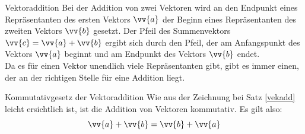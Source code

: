 \begin{satz}{Vektoraddition}{}\label{vekadd}
Bei der Addition von zwei Vektoren wird an den Endpunkt eines Repräsentanten des ersten Vektors $\vv{a}$ der Beginn eines Repräsentanten des zweiten Vektors $\vv{b}$ gesetzt. Der Pfeil des Summenvektors $\vv{c} = \vv{a} + \vv{b}$ ergibt sich durch den Pfeil, der am Anfangspunkt des Vektors $\vv{a}$ beginnt und am Endpunkt des Vektors $\vv{b}$ endet.\\
Da es für einen Vektor unendlich viele Repräsentanten gibt, gibt es immer einen, der an der \glqq richtigen\grqq{} Stelle für eine Addition liegt.
\begin{center}
 
\end{center}
\end{satz}
\begin{satz}{Kommutativgesetz der Vektoraddition}{}\label{komuvekadd}
  Wie aus der Zeichnung bei Satz \ref{vekadd} leicht ersichtlich ist, ist die Addition von Vektoren kommutativ. Es gilt also: $$\vv{a} + \vv{b} = \vv{b} +\vv{a}$$ 
\end{satz}

